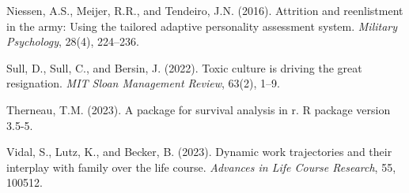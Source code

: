 \documentclass[../main.tex]{subfiles}
\begin{document}
\begin{thebibliography}{40}
Niessen, A.S., Meijer, R.R., and Tendeiro, J.N. (2016).
\newblock Attrition and reenlistment in the army: Using the tailored adaptive personality assessment system.
\newblock \emph{Military Psychology}, 28(4), 224--236.

Sull, D., Sull, C., and Bersin, J. (2022).
\newblock Toxic culture is driving the great resignation.
\newblock \emph{MIT Sloan Management Review}, 63(2), 1--9.

Therneau, T.M. (2023).
\newblock A package for survival analysis in r.
\newblock R package version 3.5-5.

Vidal, S., Lutz, K., and Becker, B. (2023).
\newblock Dynamic work trajectories and their interplay with family over the life course.
\newblock \emph{Advances in Life Course Research}, 55, 100512.

\end{thebibliography}
\end{document}
